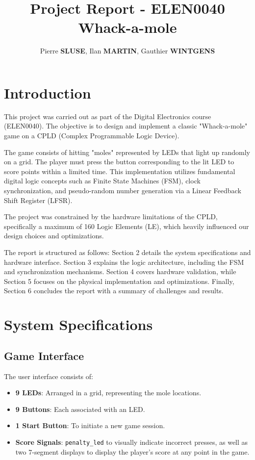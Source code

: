 \documentclass[12pt,a4paper]{article}
\title{Project Report - ELEN0040 \\ Whack-a-mole}
\author{Pierre \textbf{SLUSE}, Ilan \textbf{MARTIN}, Gauthier \textbf{WINTGENS} }
\begin{document}
\maketitle


\tableofcontents
\newpage

\section{Introduction}
This project was carried out as part of the Digital Electronics course (ELEN0040). The objective is to design and implement a classic "Whack-a-mole" game on a CPLD (Complex Programmable Logic Device).

The game consists of hitting "moles" represented by LEDs that light up randomly on a grid. The player must press the button corresponding to the lit LED to score points within a limited time. This implementation utilizes fundamental digital logic concepts such as Finite State Machines (FSM), clock synchronization, and pseudo-random number generation via a Linear Feedback Shift Register (LFSR). 

The project was constrained by the hardware limitations of the CPLD, specifically a maximum of 160 Logic Elements (LE), which heavily influenced our design choices and optimizations.

The report is structured as follows: Section 2 details the system specifications and hardware interface. Section 3 explains the logic architecture, including the FSM and synchronization mechanisms. Section 4 covers hardware validation, while Section 5 focuses on the physical implementation and optimizations. Finally, Section 6 concludes the report with a summary of challenges and results.

\section{System Specifications}

\subsection{Game Interface}
The user interface consists of:
\begin{itemize}
    \item \textbf{9 LEDs}: Arranged in a grid, representing the mole locations.
    \item \textbf{9 Buttons}: Each associated with an LED.
    \item \textbf{1 Start Button}: To initiate a new game session.
    \item \textbf{Score Signals}: \texttt{penalty\_led} to visually indicate incorrect presses, as well as two 7-segment displays to display the player's score at any point in the game. 
\end{itemize}
\end{document}
